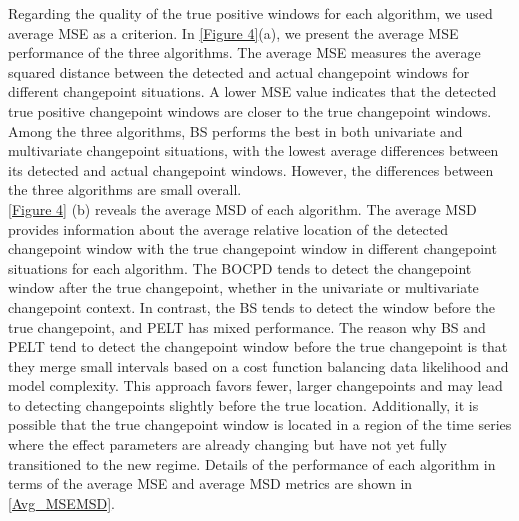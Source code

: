 \documentclass[]{interact}
\theoremstyle{plain}%
\theoremstyle{definition}
\theoremstyle{remark}
\begin{document}
    Regarding the quality of the true positive windows for each algorithm, we used average MSE as a criterion. In \autoref{Figure 4}(a), we present the average MSE performance of the three algorithms. The average MSE measures the average squared distance between the detected and actual changepoint windows for different changepoint situations. A lower MSE value indicates that the detected true positive changepoint windows are closer to the true changepoint windows. Among the three algorithms, BS performs the best in both univariate and multivariate changepoint situations, with the lowest average differences between its detected and actual changepoint windows. However, the differences between the three algorithms are small overall. \\
    
    \autoref{Figure 4} (b) reveals the average MSD of each algorithm. The average MSD provides information about the average relative location of the detected changepoint window with the true changepoint window in different changepoint situations for each algorithm. The BOCPD tends to detect the changepoint window after the true changepoint, whether in the univariate or multivariate changepoint context. In contrast, the BS tends to detect the window before the true changepoint, and PELT has mixed performance. The reason why BS and PELT tend to detect the changepoint window before the true changepoint is that they merge small intervals based on a cost function balancing data likelihood and model complexity\cite{killickOptimalDetectionChangepoints2012}. This approach favors fewer, larger changepoints and may lead to detecting changepoints slightly before the true location\citealp{fearnheadChangepointDetectionPresence2019}. Additionally, it is possible that the true changepoint window is located in a region of the time series where the effect parameters are already changing but have not yet fully transitioned to the new regime. Details of the performance of each algorithm in terms of the average MSE and average MSD metrics are shown in \autoref{Avg_MSEMSD}.
\end{document}
